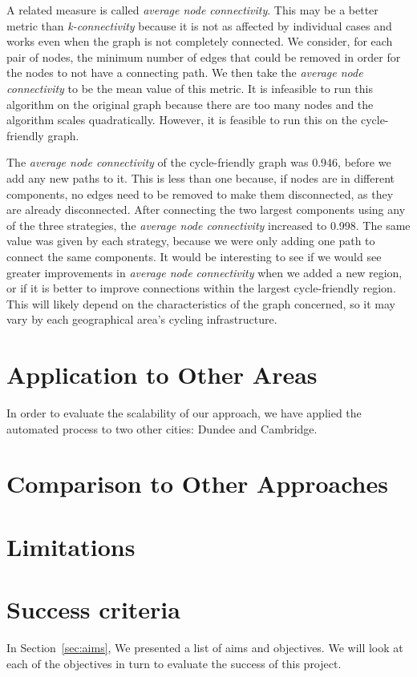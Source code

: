 \documentclass[12pt,a4paper]{report}
\begin{document}
A related measure is called \textit{average node connectivity}. This may be a better metric than \textit{k-connectivity} because it is not as affected by individual cases and works even when the graph is not completely connected. We consider, for each pair of nodes, the minimum number of edges that could be removed in order for the nodes to not have a connecting path. We then take the \textit{average node connectivity} to be the mean value of this metric. It is infeasible to run this algorithm on the original graph because there are too many nodes and the algorithm scales quadratically. However, it is feasible to run this on the cycle-friendly graph.

The \textit{average node connectivity} of the cycle-friendly graph was 0.946, before we add any new paths to it. This is less than one because, if nodes are in different components, no edges need to be removed to make them disconnected, as they are already disconnected. After connecting the two largest components using any of the three strategies, the \textit{average node connectivity} increased to 0.998. The same value was given by each strategy, because we were only adding one path to connect the same components. It would be interesting to see if we would see greater improvements in \textit{average node connectivity} when we added a new region, or if it is better to improve connections within the largest cycle-friendly region. This will likely depend on the characteristics of the graph concerned, so it may vary by each geographical area's cycling infrastructure.

\section{Application to Other Areas}
In order to evaluate the scalability of our approach, we have applied the automated process to two other cities: Dundee and Cambridge.

\section{Comparison to Other Approaches}

\section{Limitations}


\section{Success criteria}
In Section~\ref{sec:aims}, We presented a list of aims and objectives. We will look at each of the objectives in turn to evaluate the success of this project.
\end{document}
